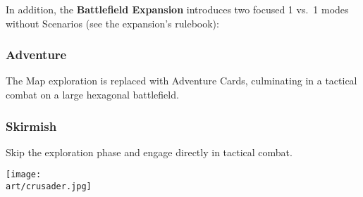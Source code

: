 \begin{multicols*}{2}
\columnbreak

In addition, the \textbf{Battlefield Expansion} introduces two focused 1 vs.~1 modes without Scenarios (see the expansion's rulebook):

\subsubsection*{Adventure}
The Map exploration is replaced with Adventure Cards, culminating in a tactical combat on a large hexagonal battlefield.

\subsubsection*{Skirmish}
Skip the exploration phase and engage directly in tactical combat.

\bigskip
\vspace*{\fill}
\texttt{[image: \\art/crusader.jpg]}
\vspace*{\fill}

\end{multicols*}
